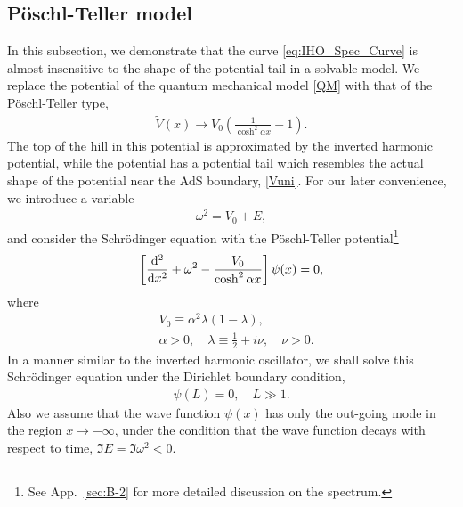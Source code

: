 \documentclass[a4paper,11pt]{article}
\begin{document}
\subsection{P\"{o}schl-Teller model}

In this subsection, we demonstrate that the curve \eqref{eq:IHO_Spec_Curve} is almost insensitive to the shape of the potential tail in a solvable model.
We replace the potential of the quantum mechanical model \eqref{QM} with that of the P\"{o}schl-Teller type,
\begin{align}
    \widetilde{V}(x)
    \rightarrow V_0\left(\frac{1}{\cosh^2\alpha x}-1\right).
\end{align}
The top of the hill in this potential is approximated by the inverted harmonic potential, while the potential has a potential tail which resembles the actual shape of the potential near the AdS boundary, \eqref{Vuni}.
For our later convenience, we introduce a variable
\begin{align}
    \omega^2 = V_0 + E,
\end{align}
and consider the Schr\"{o}dinger equation
with the P\"{o}schl-Teller potential\footnote{See App.~\ref{sec:B-2} for more detailed discussion on the spectrum.}
\begin{align}
	\left[
	\dv[2]{x} + \omega^2
        -\frac{V_0}{\cosh^2\alpha x}
	\right]
	\psi(x)
	= 0,
\end{align}
where
\begin{align}
    &V_0 \equiv  \alpha^2 \lambda(1-\lambda), \\
    &\alpha > 0, \quad
    \lambda \equiv  \frac{1}{2} + i\nu, \quad \nu > 0.
\end{align}
In a manner similar to the inverted harmonic oscillator,
we shall solve this Schr\"{o}dinger equation
under the Dirichlet boundary condition,
\begin{align}
    \psi(L) = 0, \quad
    L \gg 1.
\end{align}
Also we assume that
the wave function $\psi(x)$ has only the out-going mode
in the region $x\rightarrow-\infty$, under the condition that the wave function decays with respect to time, $\Im E=\Im\omega^2<0$.
\end{document}

